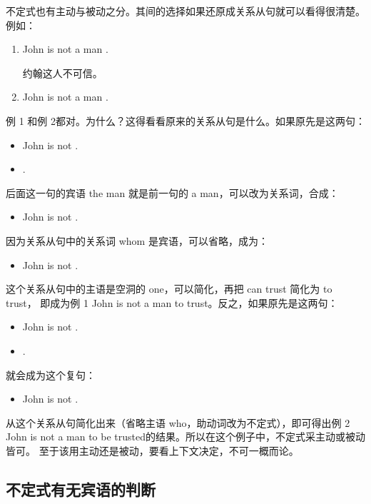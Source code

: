 不定式也有主动与被动之分。其间的选择如果还原成关系从句就可以看得很清楚。例如：
\begin{enumerate}
\item John is not a man .

  约翰这人不可信。
\item John is not a man  .
\end{enumerate}
例 1 和例 2都对。为什么？这得看看原来的关系从句是什么。如果原先是这两句：
\begin{itemize}
\item John is not .
\item {}  .
\end{itemize}
后面这一句的宾语 the man 就是前一句的 a man，可以改为关系词，合成：
\begin{itemize}
\item John is not  .
\end{itemize}

因为关系从句中的关系词 whom 是宾语，可以省略，成为：
\begin{itemize}
\item John is not  .
\end{itemize}

这个关系从句中的主语是空洞的 one，可以简化，再把 can trust 简化为 to trust，
即成为例 1 John is not a man to trust。反之，如果原先是这两句：
\begin{itemize}
\item John is not .
\item {} .
\end{itemize}
就会成为这个复句：
\begin{itemize}
\item John is not  .
\end{itemize}
从这个关系从句简化出来（省略主语 who，助动词改为不定式），即可得出例 2 John
is not a man to be trusted的结果。所以在这个例子中，不定式采主动或被动皆可。
至于该用主动还是被动，要看上下文决定，不可一概而论。

\subsection{不定式有无宾语的判断}

